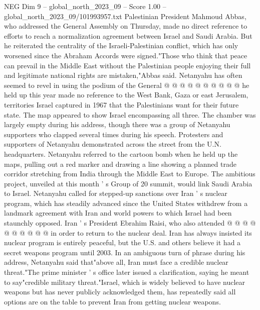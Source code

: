\begin{textsample}{NEG Dim 9 – global\_north\_2023\_09 – Score 1.00 – global\_north\_2023\_09/101993957.txt}
Palestinian President Mahmoud Abbas, who addressed the General Assembly on Thursday, made no direct reference to efforts to reach a normalization agreement between Israel and Saudi Arabia.
But he reiterated the centrality of the Israeli-Palestinian conflict, which has only worsened since the Abraham Accords were signed."Those who think that peace can prevail in the Middle East without the Palestinian people enjoying their full and legitimate national rights are mistaken,"Abbas said.
Netanyahu has often seemed to revel in using the podium of the General @ @ @ @ @ @ @ @ @ @ he held up this year made no reference to the West Bank, Gaza or east Jerusalem, territories Israel captured in 1967 that the Palestinians want for their future state.
The map appeared to show Israel encompassing all three.
The chamber was largely empty during his address, though there was a group of Netanyahu supporters who clapped several times during his speech.
Protesters and supporters of Netanyahu demonstrated across the street from the U.N. headquarters.
Netanyahu referred to the cartoon bomb when he held up the maps, pulling out a red marker and drawing a line showing a planned trade corridor stretching from India through the Middle East to Europe.
The ambitious project, unveiled at this month ' s Group of 20 summit, would link Saudi Arabia to Israel.
Netanyahu called for stepped-up sanctions over Iran ' s nuclear program, which has steadily advanced since the United States withdrew from a landmark agreement with Iran and world powers to which Israel had been staunchly opposed.
Iran ' s President Ebrahim Raisi, who also attended @ @ @ @ @ @ @ @ @ @ in order to return to the nuclear deal.
Iran has always insisted its nuclear program is entirely peaceful, but the U.S. and others believe it had a secret weapons program until 2003.
In an ambiguous turn of phrase during his address, Netanyahu said that"above all, Iran must face a credible nuclear threat."The prime minister ' s office later issued a clarification, saying he meant to say"credible military threat."Israel, which is widely believed to have nuclear weapons but has never publicly acknowledged them, has repeatedly said all options are on the table to prevent Iran from getting nuclear weapons.

\end{textsample}
